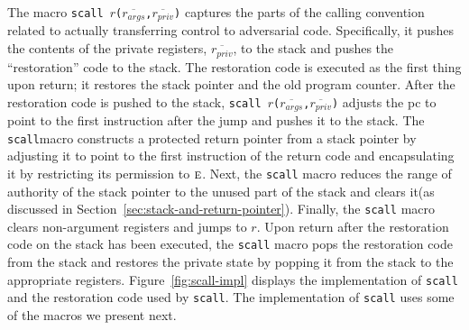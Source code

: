 \documentclass[format=acmsmall, review=true, screen=true]{acmart}
\renewcommand{\figurename}{Figure}
\newcommand{\var}[1]{\mathit{#1}}
\newcommand{\plainperm}[1]{\textsc{#1}}
\newcommand{\entry}{\plainperm{e}}
\newenvironment{toplas}%
    {\color{OliveGreen}}{}
\begin{document}
\begin{toplas}
The macro \texttt{scall
  $r$($\overline{r_{\var{args}}}$,$\overline{r_{\var{priv}}}$)} captures the
parts of the calling convention related to actually transferring control to
adversarial code. Specifically, it pushes the contents of the private registers,
$\overline{r_{\var{priv}}}$, to the stack and pushes the ``restoration'' code to
the stack. The restoration code is executed as the first thing upon return; it
restores the stack pointer and the old program counter. After the restoration
code is pushed to the stack, \texttt{scall
  $r$($\overline{r_{\var{args}}}$,$\overline{r_{\var{priv}}}$)} adjusts the pc
to point to the first instruction after the jump and pushes it to the stack. The
\texttt{scall}macro constructs a protected return pointer from a stack pointer by
adjusting it to point to the first instruction of the return code and
encapsulating it by restricting its permission to $\entry$. Next, the \texttt{scall}
macro reduces the range of authority of the stack pointer to the unused part of
the stack and clears it(as discussed in
Section~\ref{sec:stack-and-return-pointer}). Finally, the \texttt{scall} macro clears
non-argument registers and jumps to $r$. Upon return after the restoration code
on the stack has been executed, the \texttt{scall} macro pops the restoration code from
the stack and restores the private state by popping it from the stack to the
appropriate registers. \figurename~\ref{fig:scall-impl} displays the
implementation of \texttt{scall} and the restoration code used by
\texttt{scall}. The implementation of \texttt{scall} uses some of the macros we
present next.


\end{toplas}
\end{document}
